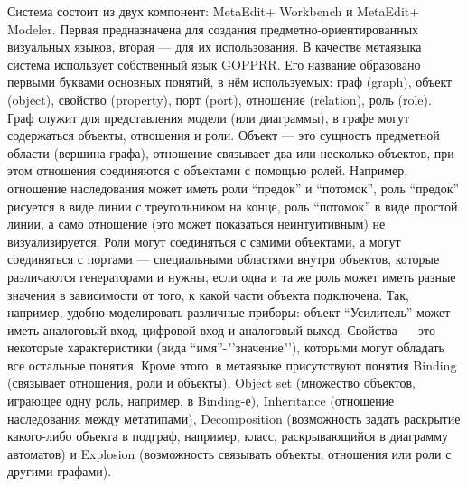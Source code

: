 Система состоит из двух компонент: MetaEdit+ Workbench и MetaEdit+ Modeler. Первая 
предназначена для создания предметно-ориентированных визуальных языков, вторая --- для 
их использования. В качестве метаязыка система использует собственный язык GOPPRR. 
Его название образовано первыми буквами основных понятий, в нём используемых: граф (graph), 
объект (object), свойство (property), порт (port), отношение (relation), роль (role). 
Граф служит для представления модели (или диаграммы), в графе могут содержаться объекты, 
отношения и роли. Объект --- это сущность предметной области (вершина графа), отношение 
связывает два или несколько объектов, при этом отношения соединяются с объектами с помощью ролей. 
Например, отношение наследования может иметь роли "`предок"' и "`потомок"', роль "`предок"' 
рисуется в виде линии с треугольником на конце, роль "`потомок"' в виде простой линии, 
а само отношение (это может показаться неинтуитивным) не визуализируется. Роли могут 
соединяться с самими объектами, а могут соединяться с портами --- специальными областями 
внутри объектов, которые различаются генераторами и нужны, если одна и та же роль может 
иметь разные значения в зависимости от того, к какой части объекта подключена. Так, 
например, удобно моделировать различные приборы: объект "`Усилитель"' может иметь аналоговый 
вход, цифровой вход и аналоговый выход. Свойства --- это некоторые характеристики 
(вида "`имя"'-"'значение"'), которыми могут обладать все остальные понятия. Кроме 
этого, в метаязыке присутствуют понятия Binding (связывает отношения, роли и объекты),
Object set (множество объектов, играющее одну роль, например, в Binding-е), Inheritance 
(отношение наследования между метатипами), Decomposition (возможность задать раскрытие 
какого-либо объекта в подграф, например, класс, раскрывающийся в диаграмму автоматов) и 
Explosion (возможность связывать объекты, отношения или роли с другими графами).

